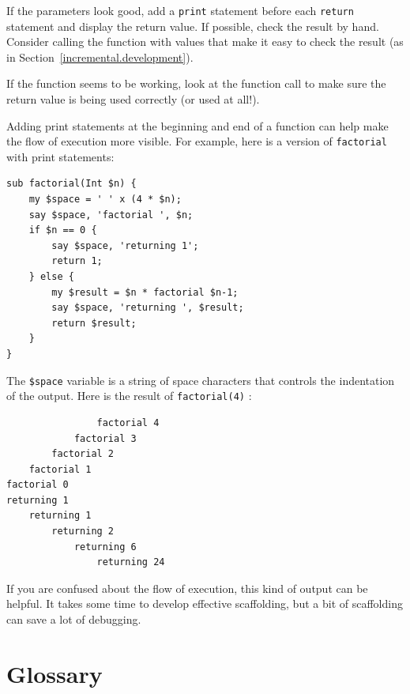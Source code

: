 If the parameters look good, add a {\tt print} statement before each
{\tt return} statement and display the return value.  If
possible, check the result by hand.  Consider calling the
function with values that make it easy to check the result
(as in Section~\ref{incremental.development}).

If the function seems to be working, look at the function call
to make sure the return value is being used correctly (or used
at all!).

Adding print statements at the beginning and end of a function
can help make the flow of execution more visible.
For example, here is a version of {\tt factorial} with
print statements:

\begin{verbatim}
sub factorial(Int $n) {
    my $space = ' ' x (4 * $n);
    say $space, 'factorial ', $n;
    if $n == 0 {
        say $space, 'returning 1';
        return 1;
    } else {
        my $result = $n * factorial $n-1;
        say $space, 'returning ', $result;
        return $result;
    }
}
\end{verbatim}
%
The {\tt \$space} variable is a string of space characters that controls the
indentation of the output.  Here is the result of {\tt factorial(4)} :

\begin{verbatim}
                factorial 4
            factorial 3
        factorial 2
    factorial 1
factorial 0
returning 1
    returning 1
        returning 2
            returning 6
                returning 24
\end{verbatim}
%
If you are confused about the flow of execution, this kind of
output can be helpful.  It takes some time to develop effective
scaffolding, but a bit of scaffolding can save a lot of debugging.


\section{Glossary}

